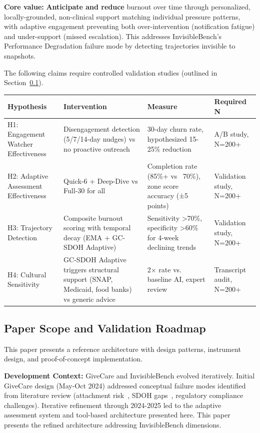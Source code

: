 \documentclass{article}
\begin{document}
\textbf{Core value:} \textbf{Anticipate and reduce} burnout over time through personalized, locally-grounded, non-clinical support matching individual pressure patterns, with adaptive engagement preventing both over-intervention (notification fatigue) and under-support (missed escalation). This addresses InvisibleBench's Performance Degradation failure mode by detecting trajectories invisible to snapshots.


\begin{tcolorbox}[colback=gcOrange!10!white,colframe=gcOrange,title=\textbf{Testable Hypotheses}]
The following claims require controlled validation studies (outlined in Section~\ref{subsec:PaperScopeandValidationRoadmap}).

\small
\centering
\begin{tabular}{p{2.5cm}p{5cm}p{2.5cm}p{2.5cm}}
\toprule
\textbf{Hypothesis} & \textbf{Intervention} & \textbf{Measure} & \textbf{Required N} \\
\midrule
H1: Engagement Watcher Effectiveness & Disengagement detection (5/7/14-day nudges) vs no proactive outreach & 30-day churn rate, hypothesized 15-25\% reduction & A/B study, N=200+ \\
\midrule
H2: Adaptive Assessment Effectiveness & Quick-6 + Deep-Dive vs Full-30 for all & Completion rate (85\%+ vs ~70\%), zone score accuracy (±5 points) & Validation study, N=200+ \\
\midrule
H3: Trajectory Detection & Composite burnout scoring with temporal decay (EMA + GC-SDOH Adaptive) & Sensitivity >70\%, specificity >60\% for 4-week declining trends & Validation study, N=200+ \\
\midrule
H4: Cultural Sensitivity & GC-SDOH Adaptive triggers structural support (SNAP, Medicaid, food banks) vs generic advice & 2$\times$ rate vs. baseline AI, expert review & Transcript audit, N=200+ \\
\bottomrule
\end{tabular}
\end{tcolorbox}
\subsection{Paper Scope and Validation Roadmap}%
\label{subsec:PaperScopeandValidationRoadmap}%
This paper presents a reference architecture with design patterns, instrument design, and proof-of-concept implementation.

\textbf{Development Context:} GiveCare and InvisibleBench evolved iteratively. Initial GiveCare design (May-Oct 2024) addressed conceptual failure modes identified from literature review (attachment risk~\cite{replika2024}, SDOH gaps~\cite{aarp2025}, regulatory compliance challenges). Iterative refinement through 2024-2025 led to the adaptive assessment system and tool-based architecture presented here. This paper presents the refined architecture addressing InvisibleBench dimensions.
\end{document}
